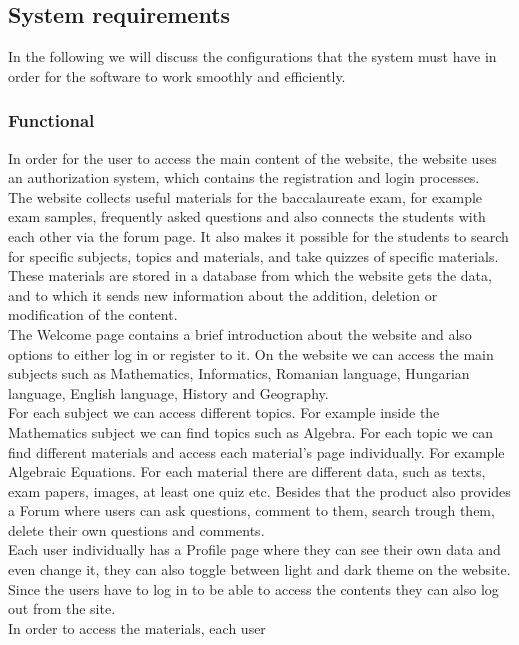 \documentclass[12pt,a4paper]{article}
\begin{document}
\begin{spacing}{1.5}
    \subsection{System requirements}
    In the following we will discuss the configurations that the system must have
    in order for the software to work smoothly and efficiently.
    \subsubsection{Functional}
    In order for the user to access the main content of the website, the website
    uses an authorization system, which contains the registration and login
    processes. \\ \indent The website collects useful materials for the
    baccalaureate exam, for example exam samples, frequently asked questions and
    also connects the students with each other via the forum page. It also makes it
    possible for the students to search for specific subjects, topics and
    materials, and take quizzes of specific materials. \\ \indent These materials
    are stored in a database from which the website gets the data, and to which it
    sends new information about the addition, deletion or modification of the
    content. \\ \indent The Welcome page contains a brief introduction about the
    website and also options to either log in or register to it. On the website we
    can access the main subjects such as Mathematics, Informatics, Romanian
    language, Hungarian language, English language, History and Geography. \\
    \indent For each subject we can access different topics. For example inside the
    Mathematics subject we can find topics such as Algebra. For each topic we can
    find different materials and access each material's page individually. For
    example Algebraic Equations. For each material there are different data, such
    as texts, exam papers, images, at least one quiz etc. Besides that the product
    also provides a Forum where users can ask questions, comment to them, search
    trough them, delete their own questions and comments. \\ \indent Each user
    individually has a Profile page where they can see their own data and even
    change it, they can also toggle between light and dark theme on the website.
    Since the users have to log in to be able to access the contents they can also
    log out from the site. \\ \indent In order to access the materials, each user

\end{spacing}
\end{document}
